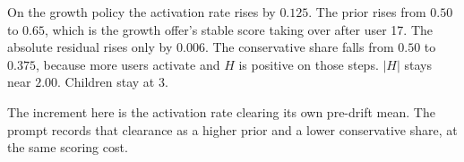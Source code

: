 \documentclass[11pt,a4paper]{article}
\begin{document}
On the growth policy the activation rate rises by \(0.125\).
The prior rises from \(0.50\) to \(0.65\), which is the growth offer's stable score taking over after user 17.
The absolute residual rises only by \(0.006\).
The conservative share falls from \(0.50\) to \(0.375\), because more users activate and \(H\) is positive on those steps.
\(|H|\) stays near \(2.00\).
Children stay at 3.

The increment here is the activation rate clearing its own pre-drift mean.
The prompt records that clearance as a higher prior and a lower conservative share, at the same scoring cost.
\end{document}
